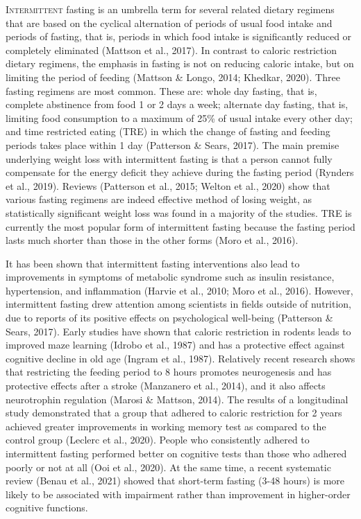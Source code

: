 \documentclass[authordate, empirical,issue]{jote-new-article}
\begin{document}
\lettrine{I}{ntermittent} fasting is an umbrella term for several related dietary regimens that are based on the cyclical alternation of periods of usual food intake and periods of fasting, that is, periods in which food intake is significantly reduced or completely eliminated (Mattson et al., 2017). In contrast to caloric restriction dietary regimens, the emphasis in fasting is not on reducing caloric intake, but on limiting the period of feeding (Mattson \& Longo, 2014; Khedkar, 2020). Three fasting regimens are most common. These are: whole day fasting, that is, complete abstinence from food 1 or 2 days a week; alternate day fasting, that is, limiting food consumption to a maximum of 25\% of usual intake every other day; and time restricted eating (TRE) in which the change of fasting and feeding periods takes place within 1 day (Patterson \& Sears, 2017). The main premise underlying weight loss with intermittent fasting is that a person cannot fully compensate for the energy deficit they achieve during the fasting period (Rynders et al., 2019). Reviews (Patterson et al., 2015; Welton et al., 2020) show that various fasting regimens are indeed effective method of losing weight, as statistically significant weight loss was found in a majority of the studies. TRE is currently the most popular form of intermittent fasting because the fasting period lasts much shorter than those in the other forms (Moro et al., 2016).


It has been shown that intermittent fasting interventions also lead to improvements in symptoms of metabolic syndrome such as insulin resistance, hypertension, and inflammation (Harvie et al., 2010; Moro et al., 2016). However, intermittent fasting drew attention among scientists in fields outside of nutrition, due to reports of its positive effects on psychological well-being (Patterson \& Sears, 2017). Early studies have shown that caloric restriction in rodents leads to improved maze learning (Idrobo et al., 1987) and has a protective effect against cognitive decline in old age (Ingram et al., 1987). Relatively recent research shows that restricting the feeding period to 8 hours promotes neurogenesis and has protective effects after a stroke (Manzanero et al., 2014), and it also affects neurotrophin regulation (Marosi \& Mattson, 2014). The results of a longitudinal study demonstrated that a group that adhered to caloric restriction for 2 years achieved greater improvements in working memory test as compared to the control group (Leclerc et al., 2020). People who consistently adhered to intermittent fasting performed better on cognitive tests than those who adhered poorly or not at all (Ooi et al., 2020). At the same time, a recent systematic review (Benau et al., 2021) showed that short-term fasting (3-48 hours) is more likely to be associated with impairment rather than improvement in higher-order cognitive functions.
\end{document}
